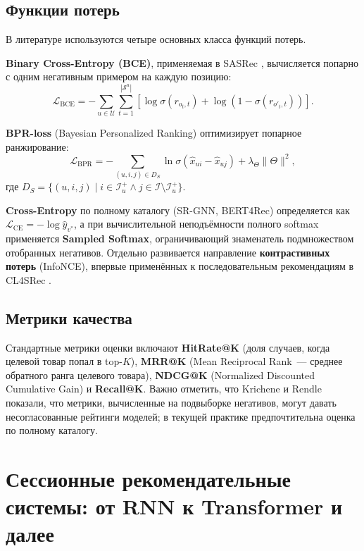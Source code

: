\subsection{Функции потерь}
\label{subsec:ch1:losses}

В литературе используются четыре основных класса функций потерь.

\textbf{Binary Cross-Entropy (BCE)}, применяемая в SASRec \cite{kang2018sasrec}, вычисляется попарно с одним негативным примером на каждую позицию:
\begin{equation}
    \mathcal{L}_{\text{BCE}} = -\sum_{u \in \mathcal{U}} \sum_{t=1}^{|\mathcal{S}^u|} \left[ \log \sigma(r_{o_t, t}) + \log(1 - \sigma(r_{o'_t, t})) \right].
\end{equation}

\textbf{BPR-loss} (Bayesian Personalized Ranking) \cite{rendle2009bpr} оптимизирует попарное ранжирование:
\begin{equation}
    \mathcal{L}_{\text{BPR}} = -\sum_{(u,i,j) \in D_S} \ln \sigma(\hat{x}_{ui} - \hat{x}_{uj}) + \lambda_\Theta \|\Theta\|^2,
\end{equation}
где $D_S = \{(u, i, j) \mid i \in \mathcal{I}^+_u \wedge j \in \mathcal{I} \setminus \mathcal{I}^+_u\}$.

\textbf{Cross-Entropy} по полному каталогу (SR-GNN, BERT4Rec) определяется как $\mathcal{L}_{\text{CE}} = -\log \hat{y}_{v^*}$, а при вычислительной неподъёмности полного softmax применяется \textbf{Sampled Softmax}, ограничивающий знаменатель подмножеством отобранных негативов. 
Отдельно развивается направление \textbf{контрастивных потерь} (InfoNCE), впервые применённых к последовательным рекомендациям в CL4SRec \cite{xie2022cl4srec}.

\subsection{Метрики качества}
\label{subsec:ch1:metrics}

Стандартные метрики оценки включают \textbf{HitRate@K} (доля случаев, когда целевой товар попал в top-$K$), \textbf{MRR@K} (Mean Reciprocal Rank~--- среднее обратного ранга целевого товара), \textbf{NDCG@K} (Normalized Discounted Cumulative Gain) и \textbf{Recall@K}. 
Важно отметить, что Krichene и Rendle \cite{krichene2020sampled} показали, что метрики, вычисленные на подвыборке негативов, могут давать несогласованные рейтинги моделей; в текущей практике предпочтительна оценка по полному каталогу.

\section{Сессионные рекомендательные системы: от RNN к Transformer и далее}
\label{sec:ch1:sequential}

